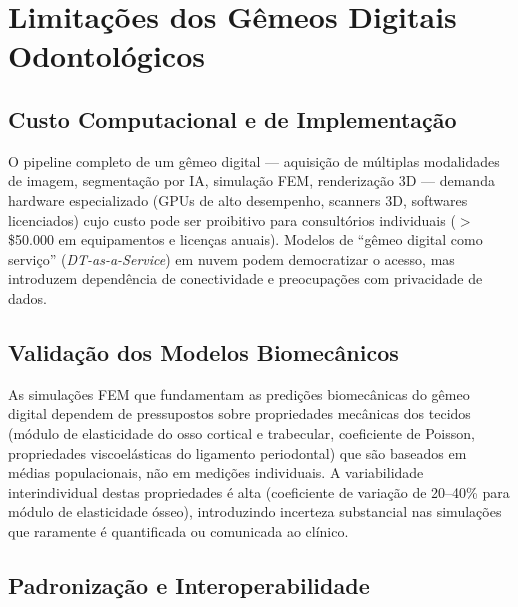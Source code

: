 \section{Limitações dos Gêmeos Digitais Odontológicos}

\subsection{Custo Computacional e de Implementação}

O pipeline completo de um gêmeo digital --- aquisição de múltiplas modalidades de imagem, segmentação por IA, simulação FEM, renderização 3D --- demanda hardware especializado (GPUs de alto desempenho, scanners 3D, softwares licenciados) cujo custo pode ser proibitivo para consultórios individuais ($>$\$50.000 em equipamentos e licenças anuais). Modelos de ``gêmeo digital como serviço'' (\textit{DT-as-a-Service}) em nuvem podem democratizar o acesso, mas introduzem dependência de conectividade e preocupações com privacidade de dados.

\subsection{Validação dos Modelos Biomecânicos}

As simulações FEM que fundamentam as predições biomecânicas do gêmeo digital dependem de pressupostos sobre propriedades mecânicas dos tecidos (módulo de elasticidade do osso cortical e trabecular, coeficiente de Poisson, propriedades viscoelásticas do ligamento periodontal) que são baseados em médias populacionais, não em medições individuais. A variabilidade interindividual destas propriedades é alta (coeficiente de variação de 20--40\% para módulo de elasticidade ósseo), introduzindo incerteza substancial nas simulações que raramente é quantificada ou comunicada ao clínico.


\subsection{Padronização e Interoperabilidade}

